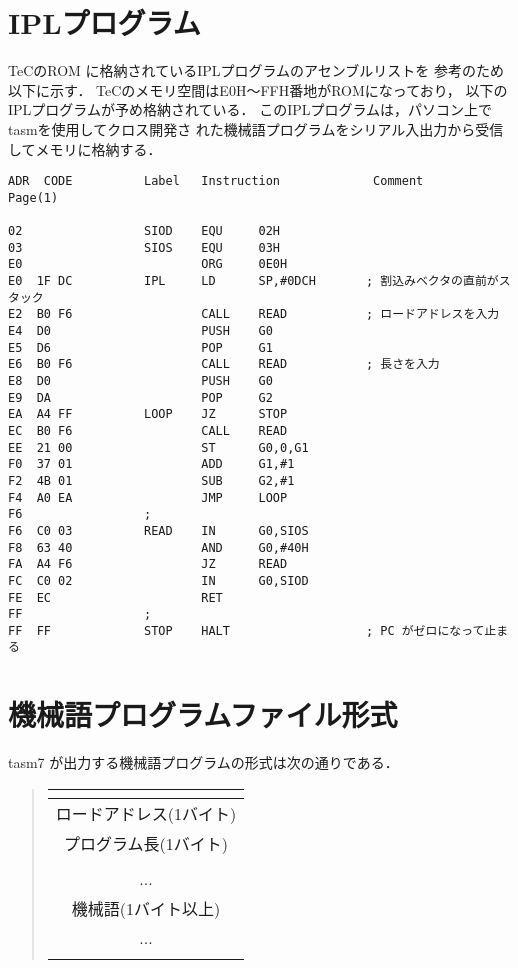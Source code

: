 \newpage
\section{IPLプログラム}\label{iplsrc}
TeCのROM に格納されているIPLプログラムのアセンブルリストを
参考のため以下に示す．
TeCのメモリ空間はE0H〜FFH番地がROMになっており，
以下のIPLプログラムが予め格納されている．
このIPLプログラムは，パソコン上でtasmを使用してクロス開発さ
れた機械語プログラムをシリアル入出力から受信してメモリに格納する．

\begin{center}
\begin{verbatim}
ADR  CODE          Label   Instruction             Comment              Page(1)

02                 SIOD    EQU     02H            
03                 SIOS    EQU     03H            
E0                         ORG     0E0H           
E0  1F DC          IPL     LD      SP,#0DCH       ; 割込みベクタの直前がスタック
E2  B0 F6                  CALL    READ           ; ロードアドレスを入力
E4  D0                     PUSH    G0             
E5  D6                     POP     G1             
E6  B0 F6                  CALL    READ           ; 長さを入力
E8  D0                     PUSH    G0             
E9  DA                     POP     G2             
EA  A4 FF          LOOP    JZ      STOP           
EC  B0 F6                  CALL    READ           
EE  21 00                  ST      G0,0,G1        
F0  37 01                  ADD     G1,#1          
F2  4B 01                  SUB     G2,#1          
F4  A0 EA                  JMP     LOOP           
F6                 ;
F6  C0 03          READ    IN      G0,SIOS        
F8  63 40                  AND     G0,#40H        
FA  A4 F6                  JZ      READ           
FC  C0 02                  IN      G0,SIOD        
FE  EC                     RET                    
FF                 ;
FF  FF             STOP    HALT                   ; PC がゼロになって止まる
\end{verbatim}
\end{center}

\newpage
\section{機械語プログラムファイル形式}
tasm7 が出力する機械語プログラムの形式は次の通りである．

\begin{quote}
{\small\bf\begin{tabular}{|c|}
\multicolumn{1}{c}{}\\
\hline
ロードアドレス(1バイト) \\
\hline
プログラム長(1バイト) \\
\hline
\\
...\\
機械語(1バイト以上) \\
...\\
\\
\hline
\end{tabular}}
\end{quote}
